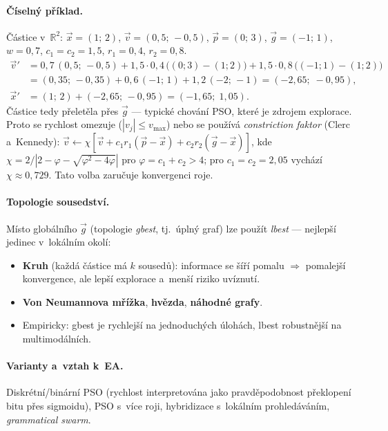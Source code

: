 \documentclass[11pt,a4paper]{article}
\theoremstyle{definition}
\begin{document}
\paragraph{Číselný příklad.} Částice v~$\mathbb{R}^2$:
$\vec x = (1;\,2)$, $\vec v = (0{,}5;\,-0{,}5)$, $\vec p = (0;\,3)$,
$\vec g = (-1;\,1)$, $w = 0{,}7$, $c_1 = c_2 = 1{,}5$, $r_1 = 0{,}4$,
$r_2 = 0{,}8$.
\begin{align*}
\vec v' &= 0{,}7\,(0{,}5;\,-0{,}5) + 1{,}5\cdot 0{,}4\,\big((0;3)-(1;2)\big)
  + 1{,}5\cdot 0{,}8\,\big((-1;1)-(1;2)\big)\\
 &= (0{,}35;\,-0{,}35) + 0{,}6\,(-1;\,1) + 1{,}2\,(-2;\,-1)
  = (-2{,}65;\; -0{,}95),\\
\vec x' &= (1;\,2) + (-2{,}65;\,-0{,}95) = (-1{,}65;\; 1{,}05).
\end{align*}
Částice tedy přeletěla přes $\vec g$ --- typické chování PSO, které je zdrojem
explorace. Proto se rychlost omezuje ($|v_j| \le v_{\max}$) nebo se používá
\emph{constriction faktor} (Clerc a~Kennedy):
$\vec v \gets \chi[\vec v + c_1 r_1(\vec p - \vec x) + c_2 r_2 (\vec g - \vec x)]$,
kde $\chi = 2/|2 - \varphi - \sqrt{\varphi^2 - 4\varphi}|$ pro
$\varphi = c_1 + c_2 > 4$; pro $c_1=c_2=2{,}05$ vychází $\chi \approx 0{,}729$.
Tato volba zaručuje konvergenci roje.

\paragraph{Topologie sousedství.} Místo globálního $\vec g$ (topologie
\emph{gbest}, tj.\ úplný graf) lze použít \emph{lbest} --- nejlepší jedinec
v~lokálním okolí:
\begin{itemize}
\item \textbf{Kruh} (každá částice má $k$ sousedů): informace se šíří pomalu
  $\Rightarrow$ pomalejší konvergence, ale lepší explorace a~menší riziko
  uvíznutí.
\item \textbf{Von Neumannova mřížka}, \textbf{hvězda}, \textbf{náhodné grafy}.
\item Empiricky: gbest je rychlejší na jednoduchých úlohách, lbest robustnější
  na multimodálních.
\end{itemize}

\paragraph{Varianty a~vztah k~EA.}
Diskrétní/binární PSO (rychlost interpretována jako pravděpodobnost překlopení
bitu přes sigmoidu), PSO s~více roji, hybridizace s~lokálním prohledáváním,
\emph{grammatical swarm}.
\end{document}
